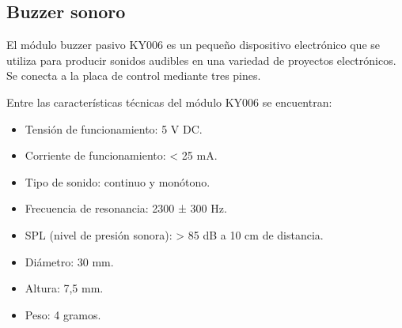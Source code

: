 \subsection{Buzzer sonoro}
\label{subsec:buzzer}

El módulo buzzer pasivo KY006 \cite{BUZZER} es un pequeño dispositivo electrónico que se utiliza para producir sonidos audibles en una variedad de proyectos electrónicos. Se conecta a la placa de control mediante tres pines.

Entre las características técnicas del módulo KY006 se encuentran:

\begin{itemize}
\item Tensión de funcionamiento: 5 V DC.
\item Corriente de funcionamiento: < 25 mA.
\item Tipo de sonido: continuo y monótono.
\item Frecuencia de resonancia: 2300 ± 300 Hz.
\item SPL (nivel de presión sonora): > 85 dB a 10 cm de distancia.
\item Diámetro: 30 mm.
\item Altura: 7,5 mm.
\item Peso: 4 gramos.
\end{itemize}


